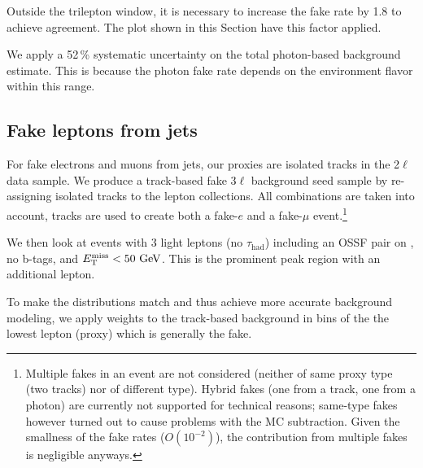 Outside the trilepton \Z window, it is necessary to increase the fake rate by 1.8 to achieve agreement. The plot shown in this Section have this factor applied.

We apply a 52\,\% systematic uncertainty on the total photon-based background estimate. This is because the photon fake rate depends on the environment flavor within this range.


\subsection{Fake leptons from jets}
\label{sec:bkg_fakeLight/jets}
For fake electrons and muons from jets, our proxies are isolated tracks in the 2$\ell$ data sample. We produce a track-based fake 3$\ell$ background seed sample by re-assigning isolated tracks to the lepton collections. All combinations are taken into account, \ie tracks are used to create both a fake-$e$ and a fake-$\mu$ event.\footnote{Multiple fakes in an event are not considered (neither of same proxy type (\eg two tracks) nor of different type). Hybrid fakes (one from a track, one from a photon) are currently not supported for technical reasons; same-type fakes however turned out to cause problems with the \ttbar MC subtraction. Given the smallness of the fake rates ($O(10^{-2})$), the contribution from multiple fakes is negligible anyways.}

We then look at events with 3 light leptons (no $\tau_\textrm{had}$) including an OSSF pair on \Z, no b-tags, and $E_{\mathrm{T}}^{\text{miss}} < 50\,\,\text{Ge\hspace{-.08em}V}$. This is the prominent \Z peak region with an additional lepton.

To make the \pt distributions match and thus achieve more accurate background modeling, we apply weights to the track-based background in bins of the the lowest \pt lepton (proxy) which is generally the fake.

